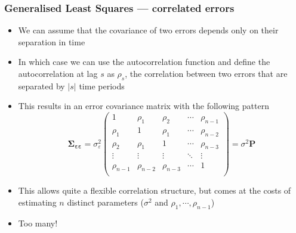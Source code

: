 \documentclass{beamer}
\begin{document}
\begin{frame}
    \frametitle{Generalised Least Squares --- correlated errors}
    \begin{itemize}
        \item We can assume that the covariance of two errors depends only on their separation in time
        \item In which case we can use the autocorrelation function and define the autocorrelation at lag $s$ as $\rho_s$, the correlation between two errors that are separated by $|s|$ time periods
        \item This results in an error covariance matrix with the following pattern
        $$\mathbf{\Sigma_{\varepsilon \varepsilon}} = \sigma^2_\varepsilon \left( \begin{array}{ccccc}
                     1          & \rho_1     & \rho_2      & \cdots & \rho_{n-1} \\
                     \rho_1     & 1          & \rho_1      & \cdots & \rho_{n-2} \\
                     \rho_2     & \rho_1     & 1           & \cdots & \rho_{n-3} \\
                     \vdots     & \vdots     & \vdots      & \ddots & \vdots     \\
                     \rho_{n-1} & \rho_{n-2} & \rho_{n-3} & \cdots & 1          \\
                 \end{array} \right) = \sigma^2\mathbf{P}$$
        \item This allows quite a flexible correlation structure, but comes at the costs of estimating $n$ distinct parameters ($\sigma^2$ and $\rho_1,\cdots,\rho_{n-1}$)
        \item Too many!
    \end{itemize}
\end{frame}
\end{document}
